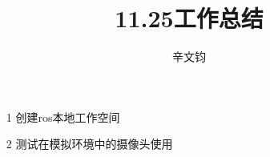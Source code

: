 \documentclass[a4paper]{article}
\title{11.25工作总结}
\author{辛文钧}
\begin{document}
	\maketitle
	\begin{itemize}
		\item[1] 创建ros本地工作空间
		\item[2] 测试在模拟环境中的摄像头使用
	\end{itemize}
\end{document}
